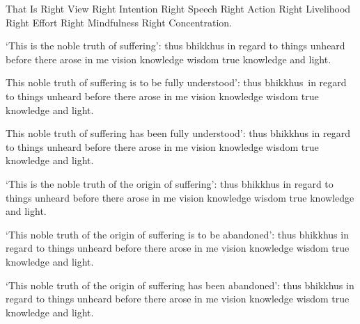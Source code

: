 \begin{english-only-hang}
  That Is Right View Right Intention Right Speech Right Action Right Livelihood Right Effort Right Mindfulness Right Concentration.
\end{english-only-hang}

\medskip

\begin{english-only-hang}
  `This is the noble truth of suffering': thus bhikkhus in regard to things unheard before there arose in me vision knowledge wisdom true knowledge and light.
\end{english-only-hang}

\medskip

\begin{english-only-hang}
  This noble truth of suffering is to be fully understood': thus \mbox{bhikkhus}~in regard to things unheard before there arose in me vision knowledge wisdom true knowledge and light.
\end{english-only-hang}

\medskip

\begin{english-only-hang}
  This noble truth of suffering has been fully understood': thus bhikkhus in regard to things unheard before there arose in me vision knowledge wisdom true knowledge and light.
\end{english-only-hang}

\medskip

\begin{english-only-hang}
  `This is the noble truth of the origin of suffering': thus bhikkhus in regard to things unheard before there arose in me vision knowledge wisdom true knowledge and light.
\end{english-only-hang}

\medskip

\begin{english-only-hang}
  `This noble truth of the origin of suffering is to be abandoned': thus bhikkhus in regard to things unheard before there arose in me vision knowledge wisdom true knowledge and light.
\end{english-only-hang}

\medskip

\begin{english-only-hang}
  `This noble truth of the origin of suffering has been abandoned': thus bhikkhus in regard to things unheard before there arose in me vision knowledge wisdom true knowledge and light.
\end{english-only-hang}

